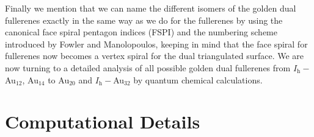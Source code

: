 Finally we mention that we can name the different isomers of the golden dual
fullerenes exactly in the same way as we do for the fullerenes by using the
canonical face spiral pentagon indices (FSPI) and the numbering scheme
introduced by Fowler and Manolopoulos,\autocite{Fowler-atlas-2006} keeping in
mind that the face spiral for fullerenes now becomes a vertex spiral for the
dual triangulated surface. We are now turning to a detailed analysis of all
possible golden dual fullerenes from $I_\mathrm{h}-$Au$_{12}$, Au$_{14}$ to Au$_{20}$
and $I_\mathrm{h}-$Au$_{32}$ by quantum chemical calculations.

\section{\label{sec:CompDet}Computational Details}

